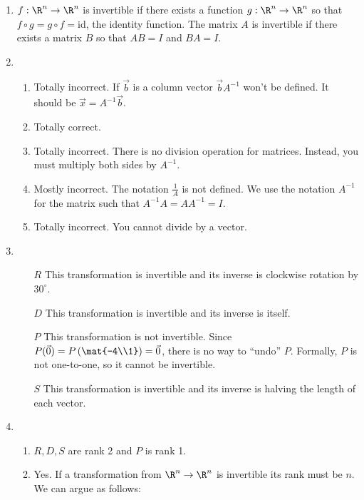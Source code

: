 		\begin{enumerate}
			\item $f:\R^n\to\R^n$ is invertible if there exists a function $g:\R^n\to\R^n$ so
				that $f\circ g=g\circ f=$id, the identity function.
				The matrix $A$ is invertible if there exists a matrix $B$ so that
				$AB=I$ and $BA=I$.
			\item \begin{enumerate}
					\item Totally incorrect. If $\vec b$ is a column
						vector $\vec b A^{-1}$ won't be defined.
						It should be $\vec x=A^{-1}\vec b$.
					\item Totally correct.
					\item Totally incorrect. There is no division operation
						for matrices. Instead, you must multiply both sides by $A^{-1}$.
					\item Mostly incorrect. The notation $\tfrac{1}{A}$ is not defined. We
						use the notation $A^{-1}$ for the matrix such that $A^{-1}A=AA^{-1}=I$.
					\item Totally incorrect. You cannot divide by a vector.
			\end{enumerate}
			\item \begin{itemize}
					\item[$R$] This transformation is invertible and its inverse is
						clockwise rotation by $30^{\circ}$.
					\item[$D$] This transformation is invertible and its inverse is
						itself.
					\item[$P$] This transformation is not invertible. Since
						$P(\vec 0) = P\left(\mat{-4\\1}\right)=\vec 0$, there
						is no way to ``undo'' $P$. Formally, $P$ is not one-to-one,
						so it cannot be invertible.
					\item[$S$] This transformation is invertible and its inverse is
						halving the length of each vector.
			\end{itemize}
			\item \begin{enumerate}
				\item $R,D,S$ are rank 2 and $P$ is rank 1.
				\item Yes. If a transformation from $\R^n\to\R^n$ is invertible
					its rank must be $n$. We can argue as follows:


\end{enumerate}
\end{enumerate}
